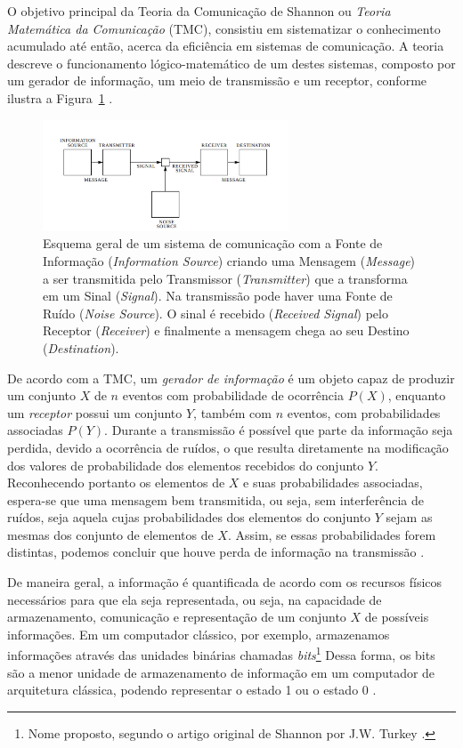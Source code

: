 \documentclass[11pt,oneside,brazil,hidelinks,article,sumario=tradicional,a4paper]{abntex2}
\begin{document}
O objetivo principal da Teoria da Comunicação de Shannon ou \textit{Teoria Matemática da Comunicação} (TMC), consistiu em sistematizar o conhecimento acumulado até então, acerca da eficiência em sistemas de comunicação. A teoria descreve o funcionamento lógico-matemático de um destes sistemas, composto por um gerador de informação, um meio de transmissão e um receptor, conforme ilustra a Figura~\ref{comunicshannon} \cite{MTC}.

\begin{figure}[ht!]
  \centering
  \caption{Esquema geral de um sistema de comunicação com a Fonte de Informação (\textit{Information Source}) criando uma Mensagem (\textit{Message}) a ser transmitida pelo Transmissor (\textit{Transmitter}) que a transforma em um Sinal (\textit{Signal}). Na transmissão pode haver uma Fonte de Ruído (\textit{Noise Source}). O sinal é recebido (\textit{Received Signal}) pelo Receptor (\textit{Receiver}) e finalmente a mensagem chega ao seu Destino (\textit{Destination}).}\label{comunicshannon}
  \includegraphics[width=0.65\textwidth]{comunicadorshannon.png}
\end{figure}

De acordo com  a TMC, um \textit{gerador de informação} é um objeto capaz de produzir um conjunto $X$ de $n$ eventos com probabilidade de ocorrência $P(X)$, enquanto um \textit{receptor} possui um conjunto $Y$, também com $n$ eventos, com probabilidades associadas $P(Y)$. Durante a transmissão é possível que parte da informação seja perdida, devido a ocorrência de ruídos, o que resulta diretamente na modificação dos valores de probabilidade dos elementos recebidos do conjunto $Y$. Reconhecendo portanto os elementos de $X$ e suas probabilidades associadas, espera-se que uma mensagem bem transmitida, ou seja, sem interferência de ruídos, seja aquela cujas probabilidades dos elementos do conjunto $Y$ sejam as mesmas dos conjunto de elementos de $X$. Assim, se essas probabilidades forem distintas, podemos concluir que houve perda de informação na transmissão \cite{mathematical}.

De maneira geral, a informação é quantificada de acordo com os recursos físicos necessários para que ela seja representada, ou seja, na capacidade de armazenamento, comunicação e representação de um conjunto $X$ de possíveis informações. Em um computador clássico, por exemplo, armazenamos informações através das unidades binárias chamadas \textit{bits}\footnote{Nome proposto, segundo o artigo original de Shannon por J.W. Turkey \cite{MTC}.} Dessa forma, os bits são a menor unidade de armazenamento de informação em um computador de arquitetura clássica, podendo representar o estado 1 ou o estado 0 \cite{MTC}.
\end{document}
